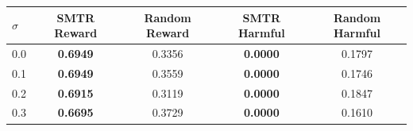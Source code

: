 \begin{tabular}{lcccc}
\toprule
$\sigma$ & SMTR Reward & Random Reward & SMTR Harmful & Random Harmful \\
\midrule
0.0 & \textbf{0.6949} & 0.3356 & \textbf{0.0000} & 0.1797 \\
0.1 & \textbf{0.6949} & 0.3559 & \textbf{0.0000} & 0.1746 \\
0.2 & \textbf{0.6915} & 0.3119 & \textbf{0.0000} & 0.1847 \\
0.3 & \textbf{0.6695} & 0.3729 & \textbf{0.0000} & 0.1610 \\
\bottomrule
\end{tabular}
